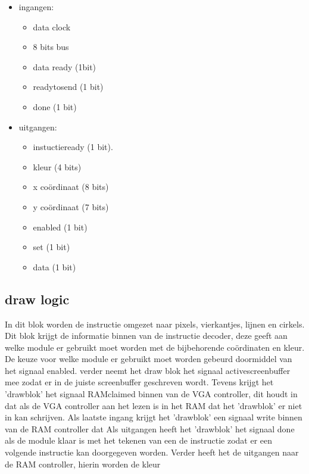 \documentclass{scrartcl}
\begin{document}
\begin {itemize}
\item ingangen:
\begin{itemize}
\item data clock  
\item 8 bits bus 
\item data ready (1bit)
\item readytosend (1 bit)
\item done (1 bit)
\end{itemize}

\item uitgangen:
\begin{itemize}
\item instuctieready (1 bit).
\item kleur (4 bits)
\item x coördinaat (8 bits)
\item y coördinaat (7 bits)
\item enabled (1 bit)
\item set (1 bit)
\item data (1 bit)
\end{itemize}
\end{itemize}




\subsection { draw logic}

In dit blok worden de instructie omgezet naar pixels, vierkantjes, lijnen en cirkels. Dit blok krijgt de informatie binnen van de instructie decoder, deze geeft aan welke module er gebruikt moet worden met de bijbehorende coördinaten en kleur.
De keuze voor welke module er gebruikt moet worden gebeurd doormiddel van het signaal enabled. verder neemt het draw blok het signaal activescreenbuffer mee zodat er in de juiste screenbuffer geschreven wordt. Tevens krijgt het 'drawblok' het signaal RAMclaimed binnen van de VGA controller, dit houdt in dat als de VGA controller aan het lezen is in het RAM dat het 'drawblok' er niet in kan schrijven. Als laatste ingang krijgt het 'drawblok' een signaal write binnen van de RAM controller dat 
Als uitgangen heeft het 'drawblok' het signaal done als de module klaar is met het tekenen van een de instructie zodat er een volgende instructie kan doorgegeven worden. Verder heeft het de uitgangen naar de RAM controller, hierin worden de kleur 
\end{document}
